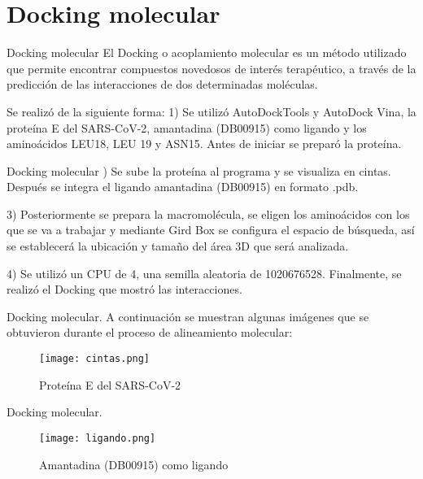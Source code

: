 \documentclass[11pt]{beamer}
\begin{document}
	
	\section{Docking molecular}
		\begin{frame}{Docking molecular}
			\justifying El Docking o acoplamiento molecular es un método utilizado que permite encontrar compuestos novedosos de interés terapéutico, a través de la predicción de las interacciones de dos determinadas moléculas.
			
			Se realizó de la siguiente forma: 1) Se utilizó AutoDockTools y AutoDock Vina, la proteína E del SARS-CoV-2, amantadina (DB00915) como ligando y los aminoácidos LEU18, LEU 19 y ASN15. Antes de iniciar se preparó la proteína.
		\end{frame}
	
	\begin{frame}{Docking molecular}
			) Se sube la proteína al programa y se visualiza en cintas. Después se integra el ligando amantadina (DB00915) en formato .pdb.
			
			3) Posteriormente se prepara la macromolécula, se eligen los aminoácidos con los que se va a trabajar y mediante Gird Box se configura el espacio de búsqueda, así se establecerá la ubicación y tamaño del área 3D que será analizada. 
			
			4) Se utilizó un CPU de 4, una semilla aleatoria de 1020676528. Finalmente, se realizó el Docking que mostró las interacciones.
		\end{frame}
		
		\begin{frame}{Docking molecular.}
			\justifying
			A continuación se muestran algunas imágenes que se obtuvieron durante el proceso de alineamiento molecular:
			\begin{figure}[H]
				\centering
				\texttt{[image: cintas.png]}
				\caption{Proteína E del SARS-CoV-2}
				\label{fig: Figura1}
			\end{figure}
		\end{frame} 
		
			\begin{frame}{Docking molecular.}
			\justifying
			\begin{figure}[H]
				\centering
				\texttt{[image: ligando.png]}
				\caption{Amantadina (DB00915) como ligando}
				\label{fig: Figura2}
			\end{figure}
		\end{frame} 
		
\end{document}
